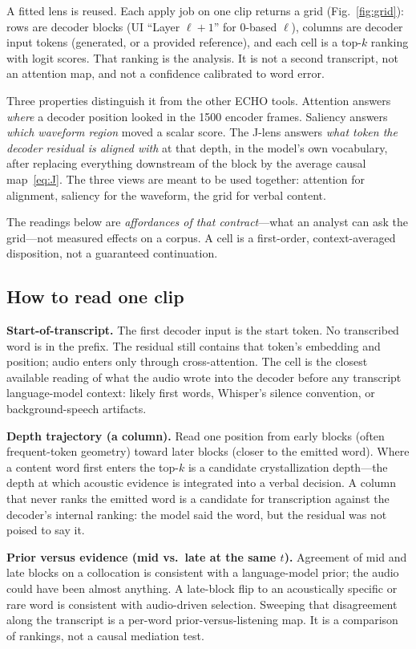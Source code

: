 \documentclass[conference]{IEEEtran}
\begin{document}
A fitted lens is reused. Each apply job on one clip returns a grid (Fig.~\ref{fig:grid}): rows are decoder blocks (UI ``Layer \(\ell{+}1\)'' for 0-based \(\ell\)), columns are decoder input tokens (generated, or a provided reference), and each cell is a top-\(k\) ranking with logit scores. That ranking is the analysis. It is not a second transcript, not an attention map, and not a confidence calibrated to word error.

Three properties distinguish it from the other ECHO tools. Attention answers \emph{where} a decoder position looked in the 1500 encoder frames. Saliency answers \emph{which waveform region} moved a scalar score. The J-lens answers \emph{what token the decoder residual is aligned with} at that depth, in the model's own vocabulary, after replacing everything downstream of the block by the average causal map~\eqref{eq:J}. The three views are meant to be used together: attention for alignment, saliency for the waveform, the grid for verbal content.

The readings below are \emph{affordances of that contract}---what an analyst can ask the grid---not measured effects on a corpus. A cell is a first-order, context-averaged disposition, not a guaranteed continuation.

\subsection{How to read one clip}

\textbf{Start-of-transcript.}
The first decoder input is the start token. No transcribed word is in the prefix. The residual still contains that token's embedding and position; audio enters only through cross-attention. The cell is the closest available reading of what the audio wrote into the decoder before any transcript language-model context: likely first words, Whisper's silence convention, or background-speech artifacts.

\textbf{Depth trajectory (a column).}
Read one position from early blocks (often frequent-token geometry) toward later blocks (closer to the emitted word). Where a content word first enters the top-\(k\) is a candidate crystallization depth---the depth at which acoustic evidence is integrated into a verbal decision. A column that never ranks the emitted word is a candidate for transcription against the decoder's internal ranking: the model said the word, but the residual was not poised to say it.

\textbf{Prior versus evidence (mid vs.\ late at the same \(t\)).}
Agreement of mid and late blocks on a collocation is consistent with a language-model prior; the audio could have been almost anything. A late-block flip to an acoustically specific or rare word is consistent with audio-driven selection. Sweeping that disagreement along the transcript is a per-word prior-versus-listening map. It is a comparison of rankings, not a causal mediation test.
\end{document}

